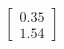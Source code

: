 \documentclass[preview]{standalone}
\begin{document}
\begin{align*}
\begin{bmatrix} 0.35 \\ 1.54 \end{bmatrix}
\end{align*}
\end{document}
